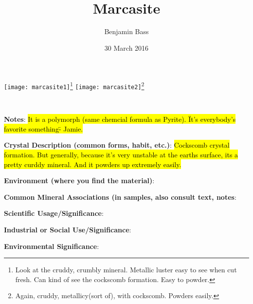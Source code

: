 \documentclass[10pt]{article}
\author{Benjamin Bass}
\date{30 March 2016}
\title{\vspace{-2.0cm}Marcasite} %
\begin{document}
\maketitle


\begin{center}
  \texttt{[image: marcasite1]}\footnote{Look at the cruddy, crumbly mineral. Metallic luster easy to see when cut fresh. Can kind of see the cockscomb formation. Easy to powder.}
  \texttt{[image: marcasite2]}\footnote{Again, cruddy, metallicy(sort of), with cockscomb. Powders easily.}
\end{center}



\
\
\
\
\
\
\
\
\
\

\begin{framed}
  \textbf{Notes}: \hl{It is a polymorph (same chemcial formula as Pyrite). \"It's everybody's favorite something\" - Jamie.}
\end{framed}

\begin{framed}
  \textbf{Crystal Description (common forms, habit, etc.)}: \hl{Cockscomb crystal formation. But generally, because it's very unstable at the earths surface, its a pretty curddy mineral. And it powders up extremely easily.}
\end{framed}

\begin{framed}
  \textbf{Environment (where you find the material)}: 
\end{framed}

\begin{framed}
  \textbf{Common Mineral Associations (in samples, also consult text, notes}: 
\end{framed}

\begin{framed}
  \textbf{Scientific Usage/Significance}: 
\end{framed}

\begin{framed}
  \textbf{Industrial or Social Use/Significance}: 
\end{framed}

\begin{framed}
  \textbf{Environmental Significance}: 
\end{framed}

\end{document}
